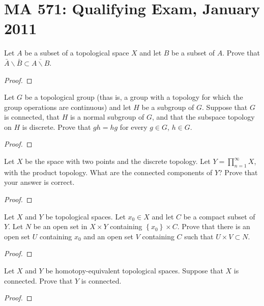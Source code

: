 \section{MA 571: Qualifying Exam, January 2011}
\begin{problem}
Let $A$ be a subset of a topological space $X$ and let $B$ be a subset of
$A$. Prove that $\bar A\smallsetminus\bar B\subset\overline{A\smallsetminus B}$.
\end{problem}
\begin{proof}
\end{proof}

\begin{problem}
Let $G$ be a topological group (thas is, a group with a topology for which
the group operations are continuous) and let $H$ be a subgroup of
$G$. Suppose that $G$ is connected, that $H$ is a normal subgroup of $G$,
and that the subspace topology on $H$ is discrete. Prove that $gh=hg$ for
every $g\in G$, $h\in G$.
\end{problem}
\begin{proof}
\end{proof}

\begin{problem}
Let $X$ be the space with two points and the discrete topology. Let
$Y=\prod_{n=1}^\infty X$, with the product topology. What are the connected
components of $Y$? Prove that your answer is correct.
\end{problem}
\begin{proof}
\end{proof}

\begin{problem}
Let $X$ and $Y$ be topological spaces. Let $x_0\in X$ and let $C$ be a
compact subset of $Y$. Let $N$ be an open set in $X\times Y$ containing
$\left\{x_0\right\}\times C$. Prove that there is an open set $U$
containing $x_0$ and an open set $V$ containing $C$ such that $U\times
V\subset N$.
\end{problem}
\begin{proof}
\end{proof}

\begin{problem}
Let $X$ and $Y$ be homotopy-equivalent topological spaces. Suppose that $X$
is connected. Prove that $Y$ is connected.
\end{problem}
\begin{proof}
\end{proof}

